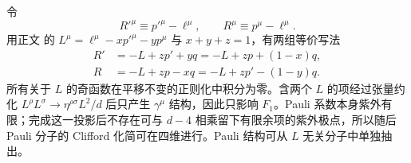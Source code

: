 \begin{derivation}

令
\begin{equation*}
 R'^\mu\equiv p'^\mu-\ell^\mu,
 \qquad
 R^\mu\equiv p^\mu-\ell^\mu.
\end{equation*}
用正文 的 $L^\mu=\ell^\mu-xp'^\mu-yp^\mu$ 与 $x+y+z=1$，有两组等价写法
\begin{align*}
 R'
 &=-L+zp'+yq
 =-L+zp+(1-x)q,\\
 R
 &=-L+zp-xq
 =-L+zp'-(1-y)q.
 \end{align*}
所有关于 $L$ 的奇函数在平移不变的正则化中积分为零。含两个 $L$ 的项经过张量约化
$L^\rho L^\sigma\to\eta^{\rho\sigma}L^2/d$ 后只产生 $\gamma^\mu$ 结构，因此只影响 $F_1$。Pauli 系数本身紫外有限；完成这一投影后不存在可与 $d-4$ 相乘留下有限余项的紫外极点，所以随后 Pauli 分子的 Clifford 化简可在四维进行。Pauli 结构可从 $L$ 无关分子中单独抽出。


\end{derivation}
